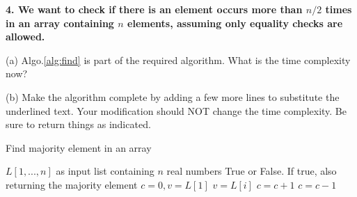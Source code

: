 \noindent \textbf{4. We want to check if there is an element occurs more than $n/2$ times in an array containing $n$ elements, assuming only equality checks are allowed.}

\noindent (a) Algo.\ref{alg:find} is part of the required algorithm. What is the time complexity now? \\
\newline

\noindent (b) Make the algorithm complete by adding a few more lines to substitute the underlined text. Your modification should NOT change the time complexity. Be sure to return things as indicated.

\begin{algorithm}
\caption{Find majority element in an array} \label{alg:find}
\begin{algorithmic}[1]
\Require $L[1, ..., n]$ as input list containing $n$ real numbers
\Ensure True or False. If true, also returning the majority element
\State $c=0, v=L[1]$
        \State $v=L[i]$
    \EndIf
        \State $c=c+1$
    \Else
        \State $c=c-1$
    \EndIf
\EndFor
{}
\end{algorithmic}
\end{algorithm}

